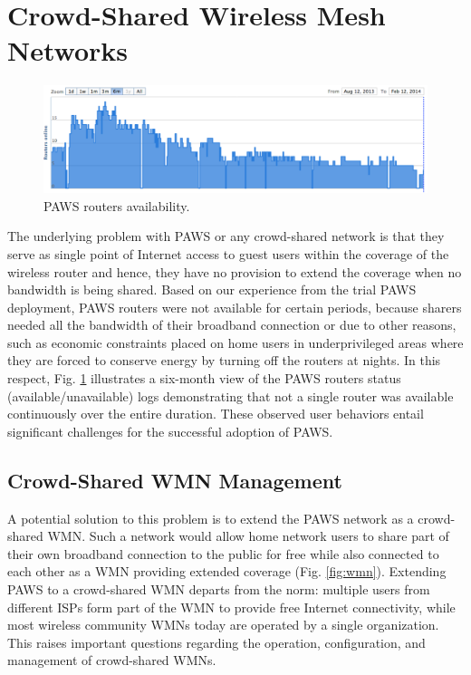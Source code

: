 \section{Crowd-Shared Wireless Mesh Networks}
\label{sec:architecture}

\begin{figure}[t]
\begin{center}
\includegraphics[width=1\linewidth]{paws-avail.pdf}  
\caption{PAWS routers availability.}
\label{fig:paws-avail}
\end{center}
\end{figure}

The underlying problem with PAWS or any crowd-shared network is that they serve as single point of Internet access to guest users within the coverage of the wireless router and hence, they have no provision to extend the coverage when no bandwidth is being shared. Based on our experience from the trial PAWS deployment, PAWS routers were not available for certain periods, because sharers needed all the bandwidth of their broadband connection or due to other reasons, such as economic constraints placed on home users in underprivileged areas where they are forced to conserve energy by turning off the routers at nights. In this respect, Fig. \ref{fig:paws-avail} illustrates a six-month view of the PAWS routers status (available/unavailable) logs demonstrating that not a single router was available continuously over the entire duration. These observed user behaviors entail significant challenges for the successful adoption of PAWS. 

\subsection{Crowd-Shared WMN Management}
\label{architecture:management}

A potential solution to this problem is to extend the PAWS network as a crowd-shared WMN. Such a network would allow home network users to share part of their own broadband connection to the public for free while also connected to each other as a WMN providing extended coverage (Fig. \ref{fig:wmn}). Extending PAWS to a crowd-shared WMN departs from the norm: multiple users from different ISPs form part of the WMN to provide free Internet connectivity, while most wireless community WMNs today are operated by a single organization. This raises important questions regarding the operation, configuration, and management of crowd-shared WMNs.  

